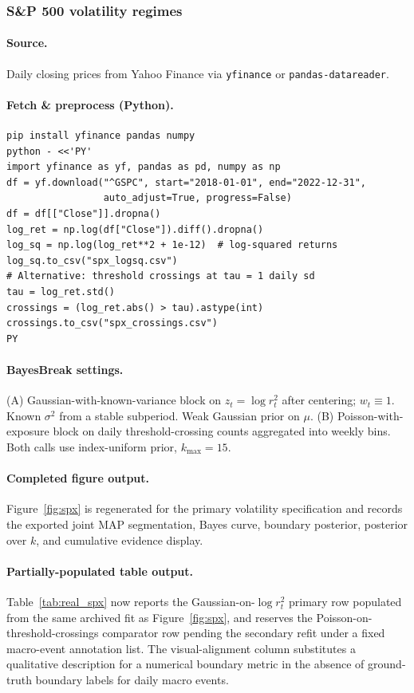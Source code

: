 \subsubsection{S\&P 500 volatility regimes}
\label{app:real-data-spx}

\paragraph{Source.}
Daily closing prices from Yahoo Finance via \texttt{yfinance} or \texttt{pandas-datareader}.

\paragraph{Fetch \& preprocess (Python).}
\begin{verbatim}
pip install yfinance pandas numpy
python - <<'PY'
import yfinance as yf, pandas as pd, numpy as np
df = yf.download("^GSPC", start="2018-01-01", end="2022-12-31",
                 auto_adjust=True, progress=False)
df = df[["Close"]].dropna()
log_ret = np.log(df["Close"]).diff().dropna()
log_sq = np.log(log_ret**2 + 1e-12)  # log-squared returns
log_sq.to_csv("spx_logsq.csv")
# Alternative: threshold crossings at tau = 1 daily sd
tau = log_ret.std()
crossings = (log_ret.abs() > tau).astype(int)
crossings.to_csv("spx_crossings.csv")
PY
\end{verbatim}

\paragraph{BayesBreak settings.}
(A) Gaussian-with-known-variance block on $z_t=\log r_t^2$ after centering; $w_t\equiv 1$. Known
$\sigma^2$ from a stable subperiod. Weak Gaussian prior on $\mu$. (B) Poisson-with-exposure
block on daily threshold-crossing counts aggregated into weekly bins. Both calls use index-uniform
prior, $k_{\max}=15$.

\paragraph{Completed figure output.}
Figure~\ref{fig:spx} is regenerated for the primary volatility specification and records the exported joint MAP segmentation, Bayes curve, boundary posterior, posterior over $k$, and cumulative evidence display.

\paragraph{Partially-populated table output.}
Table~\ref{tab:real_spx} now reports the Gaussian-on-$\log r_t^2$ primary row populated from the same archived fit as Figure~\ref{fig:spx}, and reserves the Poisson-on-threshold-crossings comparator row pending the secondary refit under a fixed macro-event annotation list. The visual-alignment column substitutes a qualitative description for a numerical boundary metric in the absence of ground-truth boundary labels for daily macro events.

